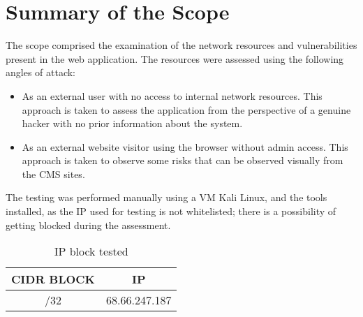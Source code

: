 \chapter{Summary of the Scope}
The scope comprised the examination of the network resources and vulnerabilities present in the web application. The resources were assessed using the following angles of attack:
\begin{itemize}
    \item As an external user with no access to internal network resources. This approach is taken to assess the application from the perspective of a genuine hacker with no prior information about the system.
    \item As an external website visitor using the browser without admin access. This approach is taken to observe some risks that can be observed visually from the CMS sites.
\end{itemize}
The testing was performed manually using a VM Kali Linux, and the tools installed, as the IP used for testing is not whitelisted; there is a possibility of getting blocked during the assessment.

\newline
\begin{table}[h!]
\centering
\begin{tabular}{||c| c||} 
 \hline
 CIDR BLOCK & IP  \\ [0.5ex] 
 \hline
 /32 & 68.66.247.187  \\
 \hline
\end{tabular}
\caption{IP block tested}
\label{table:1}
\end{table}

